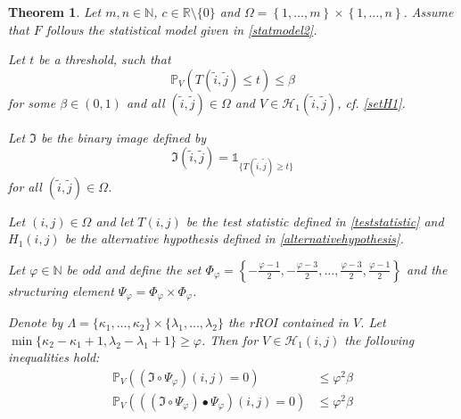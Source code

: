 \documentclass[a4paper,12pt]{article}
\theoremstyle{plain}
\newtheorem{theorem}{Theorem}[section]
\theoremstyle{definition}
\begin{document}
\begin{theorem}\label{thm: typeIIinequalities}
	Let $m, n \in \mathbb{N}$, $c \in \mathbb{R} \setminus \{ 0 \}$ and $\Omega = \left\{ 1, \dots, m \right\} \times \left\{ 1, \dots, n \right\}$. Assume that $F$ follows the statistical model given in \eqref{statmodel2}.
	
	Let $t$ be a threshold, such that
	\begin{equation*}
		\mathbb{P}_V\left( T(\tilde{i}, \tilde{j}) \leq t \right) \leq \beta
	\end{equation*}
	for some $\beta \in (0, 1)$ and all $(\tilde{i}, \tilde{j}) \in \Omega$ and $V \in \mathcal{H}_1(\tilde{i}, \tilde{j})$, cf. \eqref{setH1}.
	
	Let $\mathfrak{I}$ be the binary image defined by
	\begin{equation}
		\mathfrak{I}(\tilde{i}, \tilde{j}) = \mathds{1}_{ \{ T(\tilde{i}, \tilde{j}) \geq t \} }
	\end{equation}
	for all $(\tilde{i}, \tilde{j}) \in \Omega$.
	
	Let $(i, j) \in \Omega$ and let $T(i, j)$ be the test statistic defined in \eqref{teststatistic} and $H_1(i, j)$ be the alternative hypothesis defined in \eqref{alternativehypothesis}.
	
	Let $\varphi \in \mathbb{N}$ be odd and define the set $\Phi_\varphi = \left\{ -\frac{\varphi - 1}{2}, -\frac{\varphi - 3}{2}, \dots, \frac{\varphi - 3}{2}, \frac{\varphi - 1}{2} \right\}$ and the structuring element $\Psi_\varphi = \Phi_\varphi \times \Phi_\varphi$.
	
	Denote by $\varLambda = \{ \kappa_1, \dots, \kappa_2 \} \times \{ \lambda_1, \dots, \lambda_2 \}$ the rROI contained in $V$. Let $\min \{ \kappa_2 - \kappa_1 + 1, \lambda_2 - \lambda_1 + 1 \} \geq \varphi$.
	Then for $V \in \mathcal{H}_1(i, j)$ the following inequalities hold:
	\begin{align}
		\mathbb{P}_V\left( (\mathfrak{I} \circ \Psi_\varphi)(i, j) = 0 \right) &\leq \varphi^2 \beta \label{ineq: typeIIopening} \\
		\mathbb{P}_V\left( ((\mathfrak{I} \circ \Psi_\varphi) \bullet \Psi_\varphi)(i, j) = 0 \right) &\leq \varphi^2 \beta \label{ineq: typeIIclosing}
	\end{align}
\end{theorem}
\end{document}
